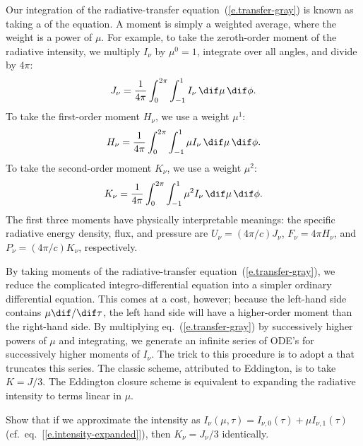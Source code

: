 \begin{sidebar}
\label{sb.intensity-moments}
Our integration of the radiative-transfer equation~(\ref{e.transfer-gray}) is known as taking a  of the equation. A moment is simply a weighted average, where the weight is a power of $\mu$. For example, to take the zeroth-order moment of the radiative intensity, we multiply $I_{\nu}$ by $\mu^{0}=1$, integrate over all angles, and divide by $4\pi$:
\[
	J_{\nu} = \frac{1}{4\pi}\int_{0}^{2\pi}\int_{-1}^{1} I_{\nu}\,\dif\mu\,\dif\phi.
\]
To take the first-order moment $H_{\nu}$, we use a weight $\mu^{1}$:
\[
	H_{\nu} = \frac{1}{4\pi}\int_{0}^{2\pi}\int_{-1}^{1}\mu I_{\nu}\,\dif\mu\,\dif\phi.
\]
To take the second-order moment $K_{\nu}$, we use a weight $\mu^{2}$:
\[
	K_{\nu} = \frac{1}{4\pi}\int_{0}^{2\pi}\int_{-1}^{1}\mu^{2} I_{\nu}\,\dif\mu\,\dif\phi.
\]
The first three moments have physically interpretable meanings: the specific radiative energy density, flux, and pressure are $U_{\nu} = (4\pi/c)J_{\nu}$, $F_{\nu} = 4\pi H_{\nu}$, and $P_{\nu} = (4\pi/c) K_{\nu}$, respectively.

By taking moments of the radiative-transfer equation~(\ref{e.transfer-gray}), we reduce the complicated integro-differential equation into a simpler ordinary differential equation. This comes at a cost, however; because the left-hand side contains $\mu\dif/\dif\tau$, the left hand side will have a higher-order moment than the right-hand side. By multiplying eq.~(\ref{e.transfer-gray}) by successively higher powers of $\mu$ and integrating, we generate an infinite series of ODE's for successively higher moments of $I_{\nu}$. The trick to this procedure is to adopt a  that truncates this series. The classic scheme, attributed to Eddington, is to take $K = J/3$. The Eddington closure scheme is equivalent to expanding the radiative intensity to terms linear in $\mu$.

\begin{exercisebox}
Show that if we approximate the intensity as $I_{\nu}(\mu,\tau) = I_{\nu,0}(\tau) + \mu I_{\nu,1}(\tau)$ (cf.\ eq.~[\ref{e.intensity-expanded}]), then $K_{\nu} = J_{\nu}/3$ identically.
\end{exercisebox}
\end{sidebar}

